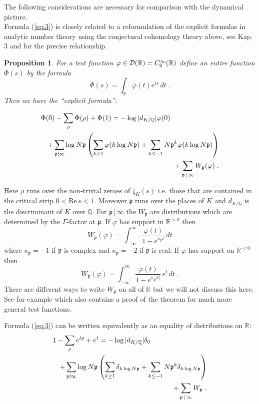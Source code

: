 \documentclass[11pt,leqno]{article}
\newcommand{\Q}{{\mathbb{Q}}}
\newcommand{\R}{{\mathbb{R}}}
\newcommand{\RRe}{\mathrm{Re}\,}
\newcommand{\Dh}{{\cal D}}
\newcommand{\ep}{\mathfrak{p}}
\newcommand{\tei}{\, | \,}
\newtheorem{prop}[theorem]{Proposition}
\begin{document}
The following considerations are necessary for comparison with the dynamical picture.\\
Formula (\ref{eq:3}) is closely related to a reformulation of the
explicit formulas in analytic number theory using the conjectural
cohomology theory above, see \cite{I} Kap. 3 and \cite{JL} for the
precise relationship. 
\begin{prop}
  \label{t2}
For a test function $\varphi \in \Dh (\R) = C^{\infty}_0 (\R)$ define an entire function $\Phi (s)$ by the formula
\[
\Phi (s) = \int_{\R} \varphi (t) e^{ts} \, dt \; .
\]
Then we have the ``explicit formula'':

\begin{eqnarray}
  \label{eq:3}
  \lefteqn{\Phi (0) - \sum_{\rho} \Phi (\rho) + \Phi (1) = - \log |d_{K / \Q}| \varphi (0)} \nonumber \\
& & + \sum_{\ep \nmid \infty} \log N \ep \left( \sum_{k \ge 1} \varphi (k \log N \ep) + \sum_{k \le -1} N \ep^k \varphi (k \log N \ep) \right) \nonumber \\
& & + \sum_{\ep \tei \infty} W_{\ep} (\varphi) \; .
\end{eqnarray}
\end{prop}

Here $\rho$ runs over the non-trivial zeroes of $\zeta_K (s)$ i.e. those that are contained in the critical strip $0 < \RRe s < 1$. Moreover $\ep$ runs over the places of $K$ and $d_{K / \Q}$ is the discriminant of $K$ over $\Q$. For $\ep \tei \infty$ the $W_{\ep}$ are distributions which are determined by the $\Gamma$-factor at $\ep$. If $\varphi$ has support in $\R^{> 0}$ then
\[
W_{\ep} (\varphi) = \int^{\infty}_{-\infty} \frac{\varphi (t)}{1 - e^{\kappa_{\ep} t}} \, dt
\]
where $\kappa_{\ep} = -1$ if $\ep$ is complex and $\kappa_{\ep} = -2$ if $\ep$ is real. If $\varphi$ has support on $\R^{< 0}$ then
\[
W_{\ep} (\varphi) = \int^{\infty}_{-\infty} \frac{\varphi (t)}{1 - e^{\kappa_{\ep} |t|}} \, e^t \, dt \; .
\]
There are different ways to write $W_{\ep}$ on all of $\R$ but we will not discuss this here. See for example \cite{Ba} which also contains a proof of the theorem for much more general test functions.

Formula (\ref{eq:3}) can be written equivalently as an equality of distributions on $\R$:
\begin{eqnarray}
  \label{eq:4}
  \lefteqn{1 - \sum_{\rho} e^{t\rho} + e^t  =  - \log |d_{K / \Q}| \delta_0} \nonumber \\
 & &  + \sum_{\ep \nmid \infty} \log N\ep \left( \sum_{k \ge 1} \delta_{k \log N \ep} + \sum_{k \le -1} N \ep^{k} \delta_{k \log N \ep} \right) \nonumber \\
& & + \sum_{\ep \tei \infty} W_{\ep} \; .
\end{eqnarray}
\end{document}

